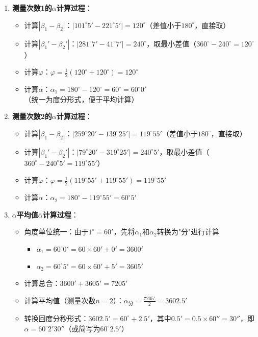 \documentclass[11pt]{article}
\begin{document}
\begin{enumerate}[itemsep=0.5ex]
  \item \textbf{测量次数1的$\alpha$计算过程}：
  \begin{itemize}[itemsep=0.3ex]
    \item 计算$|\beta_1 - \beta_2|$：$|101^\circ5' - 221^\circ5'| = 120^\circ$（差值小于$180^\circ$，直接取）
    \item 计算$|\beta_1' - \beta_2'|$：$|281^\circ7' - 41^\circ7'| = 240^\circ$，取最小差值（$360^\circ - 240^\circ = 120^\circ$）
    \item 计算$\varphi$：$\varphi = \frac{1}{2}\left(120^\circ + 120^\circ\right) = 120^\circ$
    \item 计算$\alpha$：$\alpha_1 = 180^\circ - 120^\circ = 60^\circ = 60^\circ0'$（统一为度分形式，便于平均计算）
  \end{itemize}

  \item \textbf{测量次数2的$\alpha$计算过程}：
  \begin{itemize}[itemsep=0.3ex]
    \item 计算$|\beta_1 - \beta_2|$：$|259^\circ20' - 139^\circ25'| = 119^\circ55'$（差值小于$180^\circ$，直接取）
    \item 计算$|\beta_1' - \beta_2'|$：$|79^\circ20' - 319^\circ25'| = 240^\circ5'$，取最小差值（$360^\circ - 240^\circ5' = 119^\circ55'$）
    \item 计算$\varphi$：$\varphi = \frac{1}{2}\left(119^\circ55' + 119^\circ55'\right) = 119^\circ55'$
    \item 计算$\alpha$：$\alpha_2 = 180^\circ - 119^\circ55' = 60^\circ5'$
  \end{itemize}

  \item \textbf{$\alpha$平均值$\bar{\alpha}$计算过程}：
  \begin{itemize}[itemsep=0.3ex]
    \item 角度单位统一：由于$1^\circ = 60'$，先将$\alpha_1$和$\alpha_2$转换为"分"进行计算
      \begin{itemize}
        \item $\alpha_1 = 60^\circ0' = 60 \times 60' + 0' = 3600'$
        \item $\alpha_2 = 60^\circ5' = 60 \times 60' + 5' = 3605'$
      \end{itemize}
    \item 计算总合：$3600' + 3605' = 7205'$
    \item 计算平均值（测量次数$n=2$）：$\bar{\alpha}_{\text{分}} = \frac{7205'}{2} = 3602.5'$
    \item 转换回度分秒形式：$3602.5' = 60^\circ + 2.5'$，其中$0.5' = 0.5 \times 60'' = 30''$，即$\bar{\alpha} = 60^\circ2'30''$（或简写为$60^\circ2.5'$）
  \end{itemize}
\end{enumerate}
\end{document}
